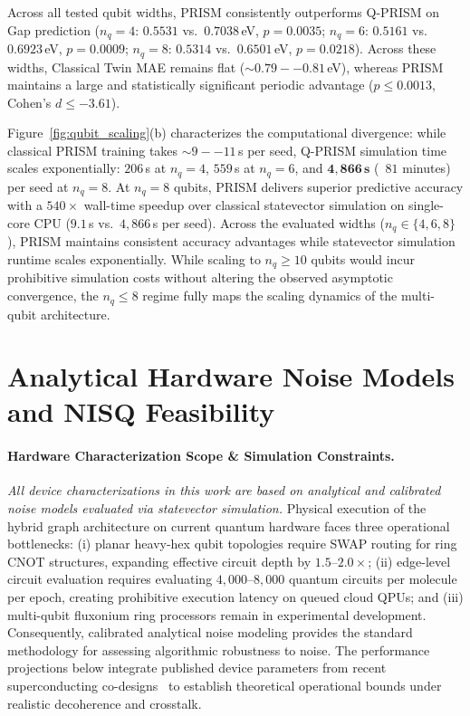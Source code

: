 \documentclass[10pt,twocolumn,letterpaper]{article}
\begin{document}
Across all tested qubit widths, PRISM consistently outperforms Q-PRISM on Gap prediction ($n_q = 4$: $0.5531$ vs.\ $0.7038$\,eV, $p = 0.0035$; $n_q = 6$: $0.5161$ vs.\ $0.6923$\,eV, $p = 0.0009$; $n_q = 8$: $0.5314$ vs.\ $0.6501$\,eV, $p = 0.0218$). Across these widths, Classical Twin MAE remains flat ($\sim 0.79--0.81$\,eV), whereas PRISM maintains a large and statistically significant periodic advantage ($p \le 0.0013$, Cohen's $d \le -3.61$).

Figure~\ref{fig:qubit_scaling}(b) characterizes the computational divergence: while classical PRISM training takes $\sim 9--11$\,s per seed, Q-PRISM simulation time scales exponentially: $206$\,s at $n_q = 4$, $559$\,s at $n_q = 6$, and $\mathbf{4{,}866\,\text{s}}$ (~$81$ minutes) per seed at $n_q = 8$. At $n_q = 8$ qubits, PRISM delivers superior predictive accuracy with a $540\times$ wall-time speedup over classical statevector simulation on single-core CPU ($9.1$\,s vs.\ $4{,}866$\,s per seed). Across the evaluated widths ($n_q \in \{4, 6, 8\}$), PRISM maintains consistent accuracy advantages while statevector simulation runtime scales exponentially. While scaling to $n_q \ge 10$ qubits would incur prohibitive simulation costs without altering the observed asymptotic convergence, the $n_q \le 8$ regime fully maps the scaling dynamics of the multi-qubit architecture.

\section{Analytical Hardware Noise Models and NISQ Feasibility}
\label{sm:analytical_noise_scaling}

\paragraph{Hardware Characterization Scope \& Simulation Constraints.}
\textit{All device characterizations in this work are based on analytical and calibrated noise models evaluated via statevector simulation.}
Physical execution of the hybrid graph architecture on current quantum hardware faces three operational bottlenecks: (i) planar heavy-hex qubit topologies require SWAP routing for ring CNOT structures, expanding effective circuit depth by $1.5\text{--}2.0\times$; (ii) edge-level circuit evaluation requires evaluating $4{,}000\text{--}8{,}000$ quantum circuits per molecule per epoch, creating prohibitive execution latency on queued cloud QPUs; and (iii) multi-qubit fluxonium ring processors remain in experimental development. Consequently, calibrated analytical noise modeling provides the standard methodology for assessing algorithmic robustness to noise. The performance projections below integrate published device parameters from recent superconducting co-designs~\cite{Kline:2025ecg, ding2023fluxonium, Bao:2021use} to establish theoretical operational bounds under realistic decoherence and crosstalk.
\end{document}
